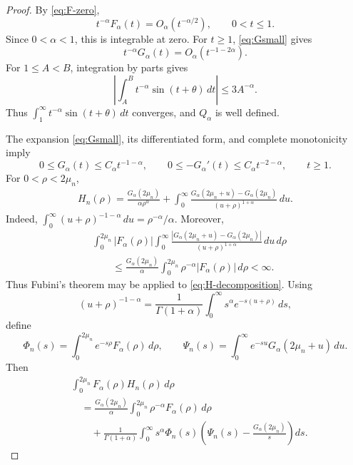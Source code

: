 \documentclass[11pt]{amsart}
\numberwithin{equation}{section}
\theoremstyle{remark}
\begin{document}
\begin{proof}
By \eqref{eq:F-zero},
\[
 t^{-\alpha}F_\alpha(t)=O_\alpha(t^{-\alpha/2}),
 \qquad 0<t\le1.
\]
Since $0<\alpha<1$, this is integrable at zero.  For $t\ge1$,
\eqref{eq:Gsmall} gives
\[
 t^{-\alpha}G_\alpha(t)=O_\alpha(t^{-1-2\alpha}).
\]
For $1\le A<B$, integration by parts gives
\[
 \left|\int_A^B t^{-\alpha}\sin(t+\theta)\,dt\right|
 \le3A^{-\alpha}.
\]
Thus $\int_1^\infty t^{-\alpha}\sin(t+\theta)\,dt$ converges, and
$Q_\alpha$ is well defined.

The expansion \eqref{eq:Gsmall}, its differentiated form, and complete
monotonicity imply
\begin{equation}\label{eq:G-tail-bounds-small}
 0\le G_\alpha(t)\le C_\alpha t^{-1-\alpha},
 \qquad
 0\le-G_\alpha'(t)\le C_\alpha t^{-2-\alpha},
 \qquad t\ge1.
\end{equation}
For $0<\rho<2\mu_n$,
\begin{equation}\label{eq:H-decomposition}
 \begin{aligned}
 H_n(\rho)
 =\frac{G_\alpha(2\mu_n)}{\alpha\rho^\alpha}+\int_0^\infty
 \frac{G_\alpha(2\mu_n+u)-G_\alpha(2\mu_n)}
 {(u+\rho)^{1+\alpha}}\,du.
 \end{aligned}
\end{equation}
Indeed,
$\int_0^\infty(u+\rho)^{-1-\alpha}\,du=\rho^{-\alpha}/\alpha$.
Moreover,
\[
 \begin{aligned}
 &\int_0^{2\mu_n}|F_\alpha(\rho)|\int_0^\infty
 \frac{|G_\alpha(2\mu_n+u)-G_\alpha(2\mu_n)|}
 {(u+\rho)^{1+\alpha}}\,du\,d\rho\\
 &\qquad\le\frac{G_\alpha(2\mu_n)}\alpha
 \int_0^{2\mu_n}\rho^{-\alpha}|F_\alpha(\rho)|\,d\rho<\infty.
 \end{aligned}
\]
Thus Fubini's theorem may be applied to \eqref{eq:H-decomposition}.  Using
\[
 (u+\rho)^{-1-\alpha}
 =\frac1{\Gamma(1+\alpha)}
 \int_0^\infty s^\alpha e^{-s(u+\rho)}\,ds,
\]
define
\[
 \Phi_n(s)=\int_0^{2\mu_n}e^{-s\rho}F_\alpha(\rho)\,d\rho,
 \qquad
 \Psi_n(s)=\int_0^\infty e^{-su}G_\alpha(2\mu_n+u)\,du.
\]
Then
\begin{equation}\label{eq:FH-Laplace-decomposition}
 \begin{aligned}
 &\int_0^{2\mu_n}F_\alpha(\rho)H_n(\rho)\,d\rho\\
 &\quad=\frac{G_\alpha(2\mu_n)}\alpha
 \int_0^{2\mu_n}\rho^{-\alpha}F_\alpha(\rho)\,d\rho\\
 &\qquad+\frac1{\Gamma(1+\alpha)}\int_0^\infty
 s^\alpha\Phi_n(s)
 \left(\Psi_n(s)-\frac{G_\alpha(2\mu_n)}s\right)ds.
 \end{aligned}
\end{equation}


\end{proof}
\end{document}
